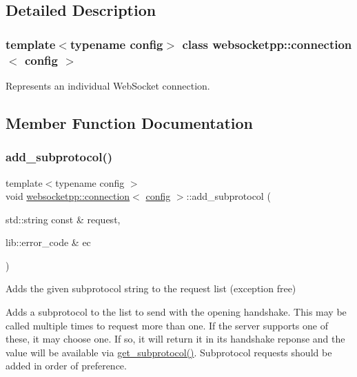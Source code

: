 \subsection{Detailed Description}
\subsubsection*{template$<$typename config$>$\newline
class websocketpp\+::connection$<$ config $>$}

Represents an individual Web\+Socket connection. 

\subsection{Member Function Documentation}
\mbox{\label{classwebsocketpp_1_1connection_a36462b406f973e16d3107e786c6b9172}} 
\subsubsection{\texorpdfstring{add\+\_\+subprotocol()}{add\_subprotocol()}\hspace{0.1cm}{\footnotesize\ttfamily [1/2]}}
{\footnotesize\ttfamily template$<$typename config $>$ \\
void \mbox{\hyperlink{classwebsocketpp_1_1connection}{websocketpp\+::connection}}$<$ \mbox{\hyperlink{classconfig}{config}} $>$\+::add\+\_\+subprotocol (\begin{DoxyParamCaption}\item[{std\+::string const \&}]{request,  }\item[{lib\+::error\+\_\+code \&}]{ec }\end{DoxyParamCaption})}



Adds the given subprotocol string to the request list (exception free) 

Adds a subprotocol to the list to send with the opening handshake. This may be called multiple times to request more than one. If the server supports one of these, it may choose one. If so, it will return it in it\textquotesingle{}s handshake reponse and the value will be available via \mbox{\hyperlink{classwebsocketpp_1_1connection_ae8577184f6e4d82955cc38e1a9f8164b}{get\+\_\+subprotocol()}}. Subprotocol requests should be added in order of preference.


